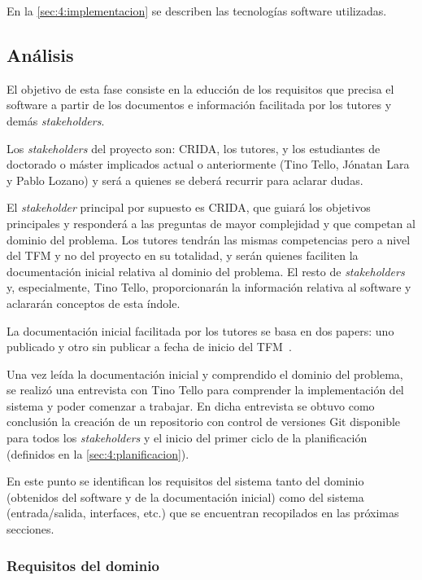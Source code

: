 En la \autoref{sec:4:implementacion} se describen las tecnologías software utilizadas.


\subsection{Análisis}
El objetivo de esta fase consiste en la educción de los requisitos que precisa el software a partir de los documentos e información facilitada por los tutores y demás \textit{stakeholders}.

Los \textit{stakeholders} del proyecto son: CRIDA, los tutores, y los estudiantes de doctorado o máster implicados actual o anteriormente (Tino Tello, Jónatan Lara y Pablo Lozano) y será a quienes se deberá recurrir para aclarar dudas. 

El \textit{stakeholder} principal por supuesto es CRIDA, que guiará los objetivos principales y responderá a las preguntas de mayor complejidad y que competan al dominio del problema. Los tutores tendrán las mismas competencias pero a nivel del TFM y no del proyecto en su totalidad, y serán quienes faciliten la documentación inicial relativa al dominio del problema. El resto de \textit{stakeholders} y, especialmente, Tino Tello, proporcionarán la información relativa al software y aclararán conceptos de esta índole.

La documentación inicial facilitada por los tutores se basa en dos papers: uno publicado y otro sin publicar a fecha de inicio del TFM~\cite{articulo1, articulo2}. 

Una vez leída la documentación inicial y comprendido el dominio del problema, se realizó una entrevista con Tino Tello para comprender la implementación del sistema \legacy{} y poder comenzar a trabajar. En dicha entrevista se obtuvo como conclusión la creación de un repositorio con control de versiones Git disponible para todos los \textit{stakeholders} y el inicio del primer ciclo de la planificación (definidos en la \autoref{sec:4:planificacion}). %

En este punto se identifican los requisitos del sistema tanto del dominio (obtenidos del software \legacy{} y de la documentación inicial) como del sistema (entrada/salida, interfaces, etc.) que se encuentran recopilados en las próximas secciones.

\subsubsection{Requisitos del dominio}
\label{sec:4:RD}

